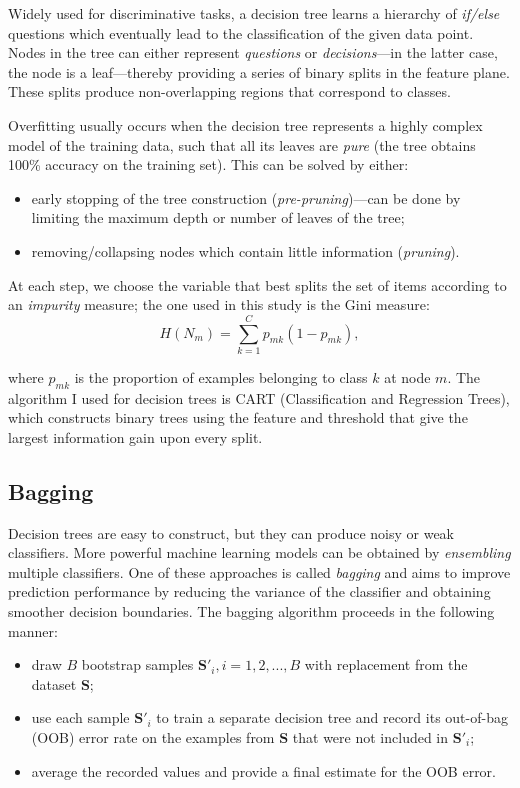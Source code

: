\documentclass[11pt]{article}
\numberwithin{equation}{section}
\begin{document}
Widely used for discriminative tasks, a decision tree learns a hierarchy of \textit{if/else} questions which eventually lead to the classification of the given data point. Nodes in the tree can either represent \textit{questions} or \textit{decisions}---in the latter case, the node is a leaf---thereby providing a series of binary splits in the feature plane. These splits produce non-overlapping regions that correspond to classes.

Overfitting usually occurs when the decision tree represents a highly complex model of the training data, such that all its leaves are \textit{pure} (the tree obtains 100\% accuracy on the training set). This can be solved by either:
\begin{itemize}
\item early stopping of the tree construction (\textit{pre-pruning})---can be done by limiting the maximum depth or number of leaves of the tree;
\item removing/collapsing nodes which contain little information (\textit{pruning}).
\end{itemize}

At each step, we choose the variable that best splits the set of items according to an \textit{impurity} measure; the one used in this study is the Gini measure:
\begin{equation}
H(N_m) = \sum_{k = 1}^{C} p_{mk} (1 - p_{mk}),
\end{equation}

where $p_{mk}$ is the proportion of examples belonging to class $k$ at node $m$. The algorithm I used for decision trees is CART (Classification and Regression Trees), which constructs binary trees using the feature and threshold that give the largest information gain upon every split.

\subsection{Bagging}

Decision trees are easy to construct, but they can produce noisy or weak classifiers. More powerful machine learning models can be obtained by \textit{ensembling} multiple classifiers. One of these approaches is called \textit{bagging} and aims to improve prediction performance by reducing the variance of the classifier and obtaining smoother decision boundaries. The bagging algorithm proceeds in the following manner:
\begin{itemize}
\item draw $B$ bootstrap samples $\mathbf{S'}_i, i = 1, 2, ..., B$ with replacement from the dataset $\mathbf{S}$;
\item use each sample $\mathbf{S'}_i$ to train a separate decision tree and record its out-of-bag (OOB) error rate on the examples from $\mathbf{S}$ that were not included in $\mathbf{S'}_i$;
\item average the recorded values and provide a final estimate for the OOB error.
\end{itemize}
\end{document}
